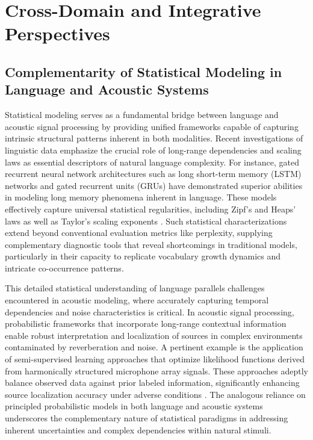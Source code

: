 \documentclass[sigconf]{acmart}
\begin{document}
\section{Cross-Domain and Integrative Perspectives}

\subsection{Complementarity of Statistical Modeling in Language and Acoustic Systems}

Statistical modeling serves as a fundamental bridge between language and acoustic signal processing by providing unified frameworks capable of capturing intrinsic structural patterns inherent in both modalities. Recent investigations of linguistic data emphasize the crucial role of long-range dependencies and scaling laws as essential descriptors of natural language complexity. For instance, gated recurrent neural network architectures such as long short-term memory (LSTM) networks and gated recurrent units (GRUs) have demonstrated superior abilities in modeling long memory phenomena inherent in language. These models effectively capture universal statistical regularities, including Zipf’s and Heaps’ laws as well as Taylor’s scaling exponents \cite{ref51}. Such statistical characterizations extend beyond conventional evaluation metrics like perplexity, supplying complementary diagnostic tools that reveal shortcomings in traditional models, particularly in their capacity to replicate vocabulary growth dynamics and intricate co-occurrence patterns.

This detailed statistical understanding of language parallels challenges encountered in acoustic modeling, where accurately capturing temporal dependencies and noise characteristics is critical. In acoustic signal processing, probabilistic frameworks that incorporate long-range contextual information enable robust interpretation and localization of sources in complex environments contaminated by reverberation and noise. A pertinent example is the application of semi-supervised learning approaches that optimize likelihood functions derived from harmonically structured microphone array signals. These approaches adeptly balance observed data against prior labeled information, significantly enhancing source localization accuracy under adverse conditions \cite{ref52}. The analogous reliance on principled probabilistic models in both language and acoustic systems underscores the complementary nature of statistical paradigms in addressing inherent uncertainties and complex dependencies within natural stimuli.
\end{document}
